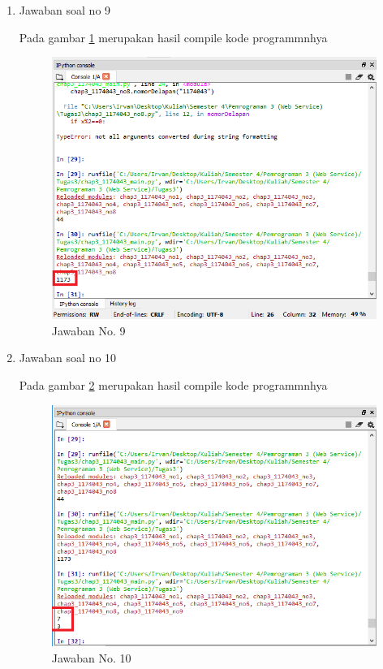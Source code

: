 \begin{enumerate}
			
				
			\item Jawaban soal no 9
				
				
				\subitem Pada gambar \ref{gambar9} merupakan hasil compile kode programmnhya

				\begin{figure} [ht]
					\centerline{\includegraphics[width=1\textwidth]{figures/chapter3/9_1174043.png}}
					\caption{Jawaban No. 9}
					\label{gambar9}
				\end{figure}

				
			\item Jawaban soal no 10
				
				
				\subitem Pada gambar \ref{gambar10} merupakan hasil compile kode programmnhya

				\begin{figure} [ht]
					\centerline{\includegraphics[width=1\textwidth]{figures/chapter3/10_1174043.png}}
					\caption{Jawaban No. 10}
					\label{gambar10}
				\end{figure}


\end{enumerate}
